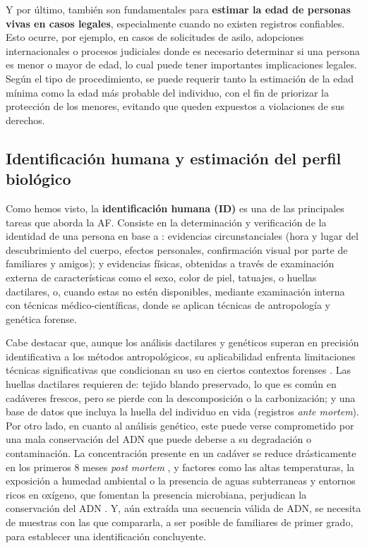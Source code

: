 Y por último, también son fundamentales para \textbf{estimar la edad de personas vivas en casos legales}, 
especialmente cuando no existen registros confiables. Esto ocurre, por ejemplo, en casos de solicitudes de 
asilo, adopciones internacionales o procesos judiciales donde es necesario determinar si una persona es menor 
o mayor de edad, lo cual puede tener importantes implicaciones legales. Según el tipo de procedimiento, se 
puede requerir tanto la estimación de la edad mínima como la edad más probable del individuo, con el fin de 
priorizar la protección de los menores, evitando que queden expuestos a violaciones de sus derechos.


\subsection{Identificación humana y estimación del perfil biológico}

Como hemos visto, la \textbf{identificación humana (ID)} es una de las principales tareas que aborda la AF.
Consiste en la determinación y verificación de la identidad de una persona en base a \cite{thompson2006}: 
evidencias circunstanciales (hora y lugar del descubrimiento del cuerpo, efectos personales, confirmación 
visual por parte de familiares y amigos); y evidencias físicas, obtenidas a través de examinación externa de 
características como el sexo, color de piel, tatuajes, o huellas dactilares, o, cuando estas no estén 
disponibles, mediante examinación interna con técnicas médico-científicas, donde se aplican técnicas de 
antropología y genética forense.

Cabe destacar que, aunque los análisis dactilares y genéticos superan en precisión identificativa a los 
métodos antropológicos, su aplicabilidad enfrenta limitaciones técnicas significativas que condicionan su uso 
en ciertos contextos forenses \cite{beauthier2009}.
Las huellas dactilares requieren de: tejido blando preservado, lo que es común en cadáveres frescos, pero se 
pierde con la descomposición o la carbonización; y una base de datos que incluya la huella del individuo en 
vida (registros \textit{ante mortem}). Por otro lado, en cuanto al análisis genético, este puede verse 
comprometido por una mala conservación del ADN que puede deberse a su degradación o contaminación. La 
concentración presente en un cadáver se reduce drásticamente en los primeros 8 meses \textit{post mortem} 
\cite{higgins2015}, y factores como las altas temperaturas, la exposición a humedad ambiental o la presencia 
de aguas subterraneas y entornos ricos en oxígeno, que fomentan la presencia microbiana, perjudican la 
conservación del ADN \cite{latham2018}. Y, aún extraída una secuencia válida de ADN, se necesita de muestras 
con las que compararla, a ser posible de familiares de primer grado, para establecer una identificación 
concluyente. 

